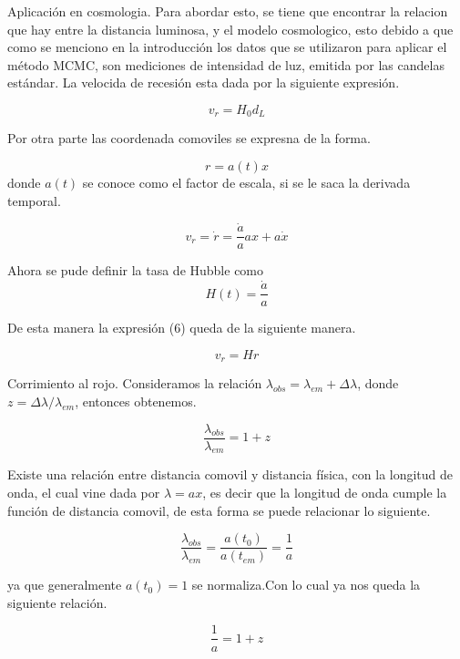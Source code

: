 \documentclass[10pt]{beamer}
\begin{document}
\begin{frame}{Aplicación en cosmologia.}
Para abordar esto, se tiene que encontrar la relacion que hay entre la distancia luminosa, y el modelo cosmologico, esto debido a que como se menciono en la introducción los datos que se utilizaron para aplicar el método MCMC, son mediciones de intensidad de luz, emitida por las candelas estándar.
La velocida de recesión esta dada por la siguiente expresión.

\begin{equation}
v_r = H_0 d_L
\end{equation}

Por otra parte las coordenada comoviles se expresna de la forma.

\begin{equation}
r = a(t)x
\end{equation}
donde $a(t)$ se conoce como el factor de escala, si se le saca la derivada temporal.

\begin{equation}
v_r = \dot{r} = \frac{\dot{a}}{a}ax + a\dot{x}
\end{equation}
\end{frame}

\begin{frame}
Ahora se pude definir la tasa de Hubble como 
\begin{equation}
H(t) = \frac{\dot{a}}{a}
\end{equation}

De esta manera la expresión (6) queda de la siguiente manera.

\begin{equation}
v_r = Hr
\end{equation}
\end{frame}

\begin{frame}{Corrimiento al rojo.}
Consideramos la relación $\lambda_{obs} = \lambda_{em} + \Delta\lambda$, donde $z = \Delta\lambda / \lambda_{em}$, entonces obtenemos.

\begin{equation}
\frac{\lambda_{obs}}{\lambda_{em}} = 1 + z
\end{equation}

Existe una relación entre distancia comovil y distancia física, con la longitud de onda, el cual vine dada por $\lambda = a x$, es decir que la longitud de onda cumple la función de distancia comovil, de esta forma se puede relacionar lo siguiente.

\begin{equation}
\frac{\lambda_{obs}}{\lambda_{em}} = \frac{a(t_0)}{a(t_{em})} = \frac{1}{a}
\end{equation}

ya que generalmente $a(t_0) = 1$ se normaliza.Con lo cual ya nos queda la siguiente relación.

\begin{equation}
\frac{1}{a} = 1 + z
\end{equation}
\end{frame}
\end{document}
